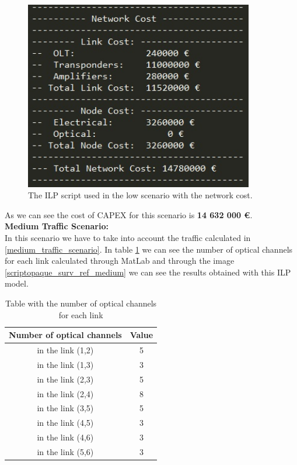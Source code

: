 \begin{figure}[h!]
\centering
\includegraphics[width=10cm]{sdf/ilp/opaque_survivability/figures/script_opaque_surv_ref_low}
\caption{The ILP script used in the low scenario with the network cost.}
\label{scriptopaque_surv_ref_low}
\end{figure}

As we can see the cost of CAPEX for this scenario is \textbf{14 632 000 \euro}.\\


\textbf{Medium Traffic Scenario:}\\

In this scenario we have to take into account the traffic calculated in \ref{medium_traffic_scenario}. In table \ref{result_ILP2_reference} we can see the number of optical channels for each link calculated through MatLab and through the image \ref{scriptopaque_surv_ref_medium} we can see the results obtained with this ILP model.\\

\begin{table}[h!]
\centering
\begin{tabular}{|| c | c||}
 \hline
 Number of optical channels & Value \\
 \hline\hline
 in the link (1,2) & 5 \\
 in the link (1,3) & 3 \\
 in the link (2,3) & 5 \\
 in the link (2,4) & 8 \\
 in the link (3,5) & 5 \\
 in the link (4,5) & 3 \\
 in the link (4,6) & 3 \\
 in the link (5,6) & 3 \\
 \hline
\end{tabular}
\caption{Table with the number of optical channels for each link}
\label{result_ILP2_reference}
\end{table}


